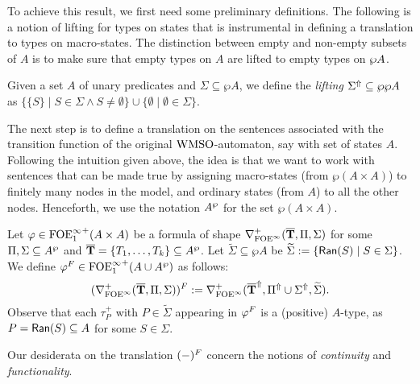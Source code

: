 To achieve this result, we first need some preliminary definitions. The following is a notion of lifting for types on states that is instrumental in defining a translation to types on macro-states. The distinction between empty and non-empty subsets of $A$ is to make sure that empty types on $A$ are lifted to empty types on $\wp A$.

\begin{definition}\label{def:typelifting}
Given a set $A$ of unary predicates and $\Sigma \subseteq \wp A$, we define the \emph{lifting} $\Sigma^{\Uparrow} \subseteq \wp \wp A$ as $\{\{S\} \mid S \in \Sigma \wedge S \neq \emptyset\} \cup
    \{\emptyset \mid \emptyset \in \Sigma \}$.
\end{definition}

The next step is to define a translation on the sentences associated with the
transition function of the original $\mathrm{WMSO}$-automaton, say with set of states $A$. Following the intuition given above, the idea is that we want to work with sentences that can be made true by assigning macro-states (from $\wp(A \times A)$) to finitely many nodes in the model, and ordinary states (from $A$) to all the other nodes. Henceforth, we use the notation $A^{\wp}$ for the set $\wp(A \times A)$.

\begin{definition}\label{DEF_finitary_lifting}
Let $\varphi \in {\ensuremath{\mathrm{FOE}^{\infty}_1}}^+(A \times A)$ be a formula of shape $\nabla^+_{\mathrm{FOE}^{\infty}}(\overline{{\mathbf{T}}},\Pi,\Sigma)$ for some $\Pi,\Sigma \subseteq A^{\wp}$ and $\overline{{\mathbf{T}}} = \{T_1,\dots,T_k\} \subseteq A^{\wp}$. Let $\widetilde{\Sigma}\subseteq \wp A$ be $\widetilde{\Sigma} := \{\mathsf{Ran}(S) \mid S \in \Sigma\}$. We define $\varphi^{F} \in {\ensuremath{\mathrm{FOE}^{\infty}_1}}^+(A \cup A^{\wp} )$ as follows:
$$(\nabla^+_{\mathrm{FOE}^{\infty}}(\overline{{\mathbf{T}}},\Pi,\Sigma))^{F} := \nabla^+_{\mathrm{FOE}^{\infty}}(\overline{{\mathbf{T}}}^{\Uparrow},\Pi^{\Uparrow} \cup \Sigma^{\Uparrow},\widetilde{\Sigma}). $$
Observe that each ${\tau}^{+}_{P}$ with $P \in \widetilde{\Sigma}$ appearing in $\varphi^{F}$ is a (positive) $A$-type, as $P = \mathsf{Ran}(S) \subseteq A$ for some $S \in \Sigma$.
\end{definition}

\noindent Our desiderata on the translation $(-)^{F}$ concern the notions of \emph{continuity} and \emph{functionality}.

